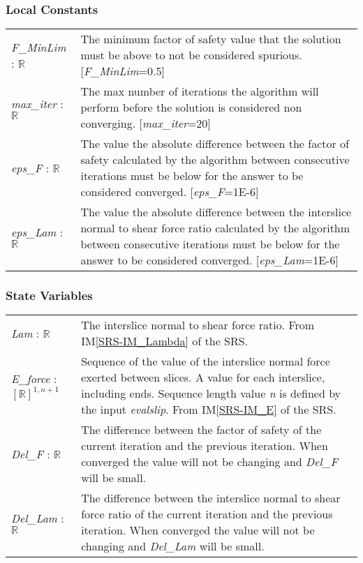 \documentclass[12pt, titlepage]{article}
\begin{document}
\subsubsection{Local Constants}
\renewcommand*{\arraystretch}{1.5}
\begin{longtable}{ p{}  p{}}
  \textit{F\_MinLim} : $\mathbb{R}$ & The minimum factor of safety
  value that the solution must be above to not be considered
  spurious. [\textit{F\_MinLim}=0.5]\\
  
  \textit{max\_iter} : $\mathbb{R}$ & The max number of iterations the
  algorithm will perform before the solution is considered non
  converging. [\textit{max\_iter}=20]\\

  \textit{eps\_F} : $\mathbb{R}$ & The value the absolute difference
  between the factor of safety calculated by the algorithm between
  consecutive iterations must be below for the answer to be considered
  converged. [\textit{eps\_F}=1E-6]\\

  \textit{eps\_Lam} : $\mathbb{R}$ & The value the absolute difference
  between the interslice normal to shear force ratio calculated by the
  algorithm between consecutive iterations must be below for the
  answer to be considered converged. [\textit{eps\_Lam}=1E-6]\\
\end{longtable}

\subsubsection{State Variables}

\renewcommand*{\arraystretch}{1.5}
\begin{longtable}{ p{}  p{}}
  \textit{Lam} : $\mathbb{R}$ & The interslice normal to shear force
  ratio. From IM\ref{SRS-IM_Lambda} of the SRS. \\

  \textit{E\_force} : $[\mathbb{R}]^{1,n+1}$ & Sequence of the value
  of the interslice normal force exerted between slices. A value for
  each interslice, including ends. Sequence length value \textit{n} is
  defined by the input \textit{evalslip}. From IM\ref{SRS-IM_E} of the
  SRS. \\

  \textit{Del\_F} : $\mathbb{R}$ & The difference between the factor
  of safety of the current iteration and the previous iteration. When
  converged the value will not be changing and \textit{Del\_F} will be
  small.\\

  \textit{Del\_Lam} : $\mathbb{R}$ & The difference between the
  interslice normal to shear force ratio of the current iteration and
  the previous iteration. When converged the value will not be
  changing and \textit{Del\_Lam} will be small.\\ 
\end{longtable}
 
\end{document}
